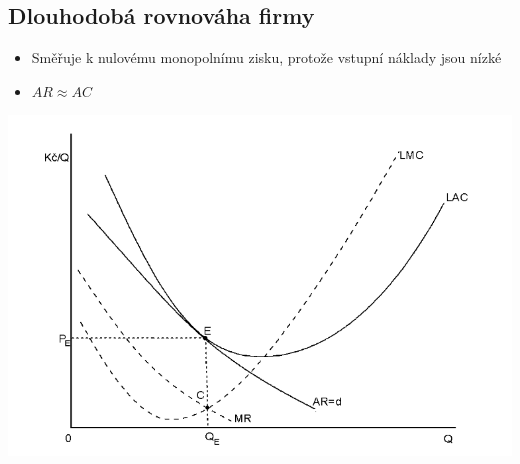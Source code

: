 \subsection{Dlouhodobá rovnováha firmy}
\begin{itemize}
    \item Směřuje k nulovému monopolnímu zisku, protože vstupní náklady jsou nízké
    \item $AR\approx AC$
\end{itemize}
\includegraphics[width=16cm]{images/15_dlouhodobe.png}